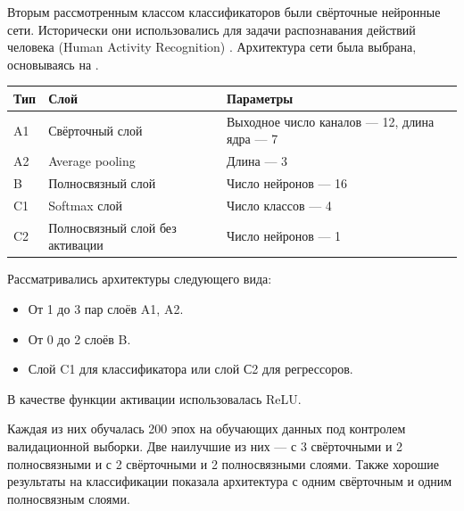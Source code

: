 \documentclass[12pt,twoside]{article}
\begin{document}
Вторым рассмотренным классом классификаторов были свёрточные нейронные сети. Исторически они использовались для задачи распознавания действий человека (Human Activity Recognition) \cite{7379395}. Архитектура сети была выбрана, основываясь на \cite{DBLP:journals/corr/abs-1809-04356} \cite{7870510}.

\begin{tabular}{l l l}
    Тип & Слой & Параметры \\
    \hline
    A1 & Свёрточный слой & Выходное число каналов --- 12, длина ядра --- 7 \\
    A2 & Average pooling & Длина --- 3\\
    B  & Полносвязный слой & Число нейронов --- 16\\
    C1 & Softmax слой & Число классов --- 4\\
    C2 & Полносвязный слой без активации & Число нейронов --- 1
\end{tabular}

Рассматривались архитектуры следующего вида:
\begin{itemize}
    \item От 1 до 3 пар слоёв A1, A2.
    \item От 0 до 2 слоёв B.
    \item Слой C1 для классификатора или слой С2 для регрессоров.
\end{itemize}
В качестве функции активации использовалась ReLU.

Каждая из них обучалась 200 эпох на обучающих данных под контролем валидационной выборки. Две наилучшие из них --- с 3 свёрточными и 2 полносвязными и с 2 свёрточными и 2 полносвязными слоями. Также хорошие результаты на классификации показала архитектура с одним свёрточным и одним полносвязным слоями.
\end{document}
